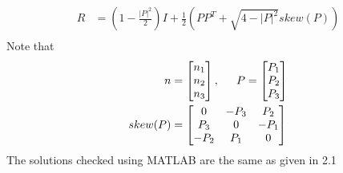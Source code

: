\documentclass[]{article}
\begin{document}
\begin{align*}
R &= (1-\frac{|P|^2}{2})I+\frac{1}{2}(PP^T+\sqrt{4-|P|^2}skew(P))\\
\end{align*}
\indent Note that
\begin{align*}
n &= 
\begin{bmatrix}
n_1\\
n_2\\
n_3\\
\end{bmatrix},\indent P =
\begin{bmatrix}
P_1\\
P_2\\
P_3\\
\end{bmatrix}\\
skew(P) &=
\begin{bmatrix}
0 & -P_{3} & P_{2}\\
P_{3} & 0 & -P_{1}\\
-P_{2} & P_{1} & 0\\
\end{bmatrix}
\end{align*}
\indent The solutions checked using MATLAB are the same as given in 2.1

\newpage
\end{document}
